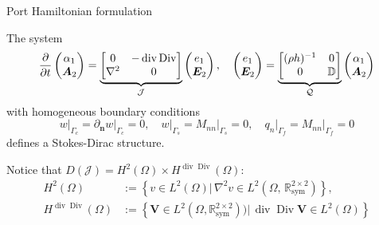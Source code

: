 \documentclass[aspectratio=169]{ISAE-Beamer}
\DeclareMathOperator*{\Div}{Div}
\renewcommand{\div}{\operatorname{div}}
\begin{document}
\begin{frame}{Port Hamiltonian formulation}
\begin{tcolorbox}
The system
\begin{equation*}
\diffp{}{t} \begin{pmatrix}
\alpha_1 \\ \bm{A}_2
\end{pmatrix} =
\underbrace{\begin{bmatrix}
0 & -\div\Div \\
\nabla^2 & 0 \\
\end{bmatrix}}_{\mathcal{J}} \begin{pmatrix}
{e}_1 \\ \bm{E}_2
\end{pmatrix}, \quad \begin{pmatrix}
{e}_1 \\ \bm{E}_2
\end{pmatrix} = \underbrace{\begin{bmatrix}
(\rho h)^{-1} & 0 \\
0 & \mathbb{D} \\
\end{bmatrix}}_{\mathcal{Q}}
\begin{pmatrix}
\alpha_1 \\ \bm{A}_2
\end{pmatrix}
\end{equation*}
with homogeneous boundary conditions 
\[w\vert_{\Gamma_c} = \partial_{\bm{n}}w \vert_{\Gamma_c}=0, \quad w\vert_{\Gamma_s} = M_{nn}\vert_{\Gamma_s} = 0, \quad q_n\vert_{\Gamma_f} = M_{nn}\vert_{\Gamma_f} = 0
\]
defines a Stokes-Dirac structure. 
\end{tcolorbox}
Notice that $D(\mathcal{J}) = H^2(\Omega) \times H^{\div\Div}(\Omega)$:
\begin{align*}
H^2(\Omega) &:= \left\{v \in L^2(\Omega) \vert \, \nabla^2 v \in L^2(\Omega, \, \mathbb{R}^{2 \times 2}_{\text{sym}}) \right\}, \\
H^{\div\Div}(\Omega) &:= \left\{ \bm{V} \in L^2(\Omega, \mathbb{R}^{2 \times 2}_{\text{sym}})) \vert \, \div\Div \bm{V} \in L^2(\Omega) \right\}
\end{align*}

\end{frame}
\end{document}
